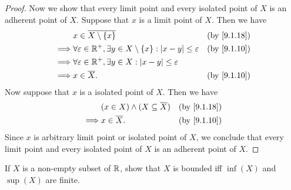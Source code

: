 \begin{proof}
  Now we show that every limit point and every isolated point of \(X\) is an adherent point of \(X\).
  Suppose that \(x\) is a limit point of \(X\).
  Then we have
  \begin{align*}
             & x \in \overline{X \setminus \{x\}}                                                           &  & \by{9.1.18} \\
    \implies & \forall \varepsilon \in \R^+, \exists y \in X \setminus \{x\} : \abs{x - y} \leq \varepsilon &  & \by{9.1.10} \\
    \implies & \forall \varepsilon \in \R^+, \exists y \in X : \abs{x - y} \leq \varepsilon                                  \\
    \implies & x \in \overline{X}.                                                                          &  & \by{9.1.10}
  \end{align*}
  Now suppose that \(x\) is a isolated point of \(X\).
  Then we have
  \begin{align*}
             & (x \in X) \land (X \subseteq \overline{X}) &  & \by{9.1.18} \\
    \implies & x \in \overline{X}.                        &  & \by{9.1.10}
  \end{align*}
  Since \(x\) is arbitrary limit point or isolated point of \(X\), we conclude that every limit point and every isolated point of \(X\) is an adherent point of \(X\).
\end{proof}

\begin{ex}\label{ex:9.1.10}
  If \(X\) is a non-empty subset of \(\mathbb{R}\), show that \(X\) is bounded iff \(\inf(X)\) and \(\sup(X)\) are finite.
\end{ex}

